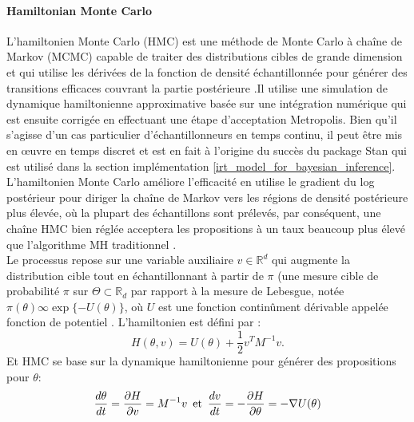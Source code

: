 \paragraph{Hamiltonian Monte Carlo \\}
L'hamiltonien Monte Carlo (HMC) est une méthode de Monte Carlo à chaîne de Markov (MCMC) capable de traiter des distributions cibles de grande dimension et qui utilise les dérivées de la fonction de densité échantillonnée pour générer des transitions efficaces couvrant la partie postérieure \cite{neal2011mcmc} \cite{betancourt2015hamiltonian}.Il utilise une simulation de dynamique hamiltonienne approximative basée sur une intégration numérique qui est ensuite corrigée en effectuant une étape d'acceptation Metropolis. Bien qu'il s'agisse d'un cas particulier d'échantillonneurs en temps continu, il peut être mis en œuvre en temps discret et est en fait à l'origine du succès du package Stan qui est utilisé dans la section implémentation \ref{irt_model_for_bayesian_inference}. L'hamiltonien Monte Carlo améliore l'efficacité en utilise le gradient du log postérieur pour diriger la chaîne de Markov vers les régions de densité postérieure plus élevée, où la plupart des échantillons sont prélevés, par conséquent, une chaîne HMC bien réglée acceptera les propositions à un taux beaucoup plus élevé que l'algorithme MH traditionnel \cite{gelman1997weak}. \\
Le processus repose sur une variable auxiliaire \(\displaystyle v \in \mathbb{R}^{d} \) qui augmente la distribution cible tout en échantillonnant à partir de \(\displaystyle \pi \) (une mesure cible de probabilité \(\displaystyle \pi \) sur \(\displaystyle \varTheta \subset \mathbb{R}_{d}\) par rapport à la mesure de Lebesgue, notée \(\displaystyle \pi(\theta) \infty \exp\{-U(\theta)\} \), où \(\displaystyle U \) est une fonction continûment dérivable appelée fonction de potentiel \cite{wu2018faster}. 
L’hamiltonien est défini par :
\begin{equation}
	H(\theta,v) = U(\theta) + \frac{1}{2}v^{T}M^{-1}v.
\end{equation}
\noindent Et HMC se base sur la dynamique hamiltonienne pour générer des propositions pour \(\displaystyle \theta \):
\begin{equation}
	\frac{d\theta}{dt} = \frac{\partial H}{\partial v} = M^{-1}v \hspace{0.5em} \text{et} \hspace{0.5em} \frac{dv}{dt} = - \frac{\partial H}{\partial \theta} = - \nabla U(\theta)
\end{equation}

